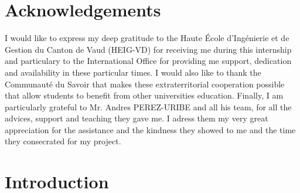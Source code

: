 \documentclass[12pt, a4paper]{report}
\begin{document}
	\makeutbmfrontcover{}

	\tableofcontents{}
	
	\printglossary
	
	\setlength{\parindent}{15pt}
	
	\chapter*{Acknowledgements}
	I would like to express my deep gratitude to the Haute École d'Ingénierie et de Gestion du Canton de Vaud (HEIG-VD) for receiving me during this internship and particulary to the International Office for providing me support, dedication and availability in these particular times.
	I would also like to thank the Communauté du Savoir that makes these extraterritorial cooperation possible that allow students to benefit from other universities education.
	Finally, I am particularly grateful to Mr. Andres PEREZ-URIBE and all his team, for all the advices, support and teaching they gave me.
	I adress them my very great appreciation for the assistance and the kindness they showed to me and the time they consecrated for my project.
	\chapter{Introduction}
\end{document}

